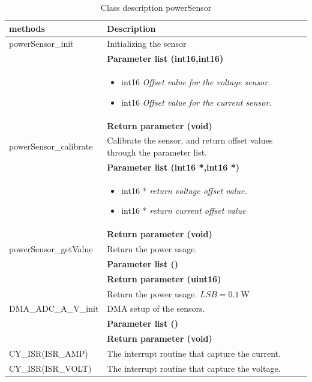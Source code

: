 \begin{table}[H]
	\centering
	\begin{tabular}{|p{5 cm}|p{10 cm}|}
		\hline
		\textbf{methods} & \textbf{Description} \\ \hline
		
		powerSensor\_init
		& Initializing the sensor
		\\ & \textbf{Parameter list (int16,int16)}
		\\ & \begin{itemize}
			\item {\large int16}
			\subitem \textit{Offset value for the voltage sensor.}
			\item {\large int16}
			\subitem \textit{Offset value for the current sensor.}
		\end{itemize}
		\\ & \textbf{Return parameter (void)}
		\\ \hline
		
		powerSensor\_calibrate
		& Calibrate the sensor, and return offset values through the parameter list.
		\\ & \textbf{Parameter list (int16 *,int16 *)}
		\\ & \begin{itemize}
			\item {\large int16 *}
			\subitem \textit{return voltage offset value.}
			\item {\large int16 *}
			\subitem \textit{return current offset value}
		\end{itemize}
		\\ & \textbf{Return parameter (void)}
		\\ \hline
		
		powerSensor\_getValue
		& Return the power usage.
		\\ & \textbf{Parameter list ()}
		\\ & \textbf{Return parameter (uint16)}
		\\ & Return the power usage. $ LSB = \SI{0.1}{\watt} $
		\\ \hline
		
		DMA\_ADC\_A\_V\_init
		& DMA setup of the sensors.
		\\ & \textbf{Parameter list ()}
		\\ & \textbf{Return parameter (void)}
		\\ \hline
		
		CY\_ISR(ISR\_AMP)
		& The interrupt routine that capture the current.
		\\ \hline
		
		CY\_ISR(ISR\_VOLT)
		& The interrupt routine that capture the voltage.
		\\ \hline
		
	\end{tabular}
	\caption{Class description powerSensor}
	\label{table:Class_description_MCU_powerSensor}
\end{table}


